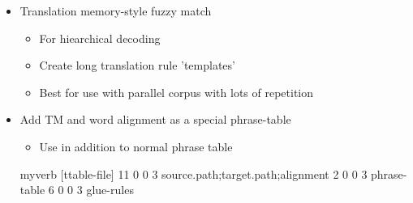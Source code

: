 \documentclass[landscape]{uedslides2C}
\newcommand{\currenttopic}[1]{\colorbox{lightyellow}{\textcolor{black}{\bf #1}}}
\begin{document}
\begin{itemize} \itemsep -1mm
\item Translation memory-style fuzzy match
  \begin{itemize}
  \item For hiearchical decoding
  \item Create long translation rule 'templates'
  \item Best for use with parallel corpus with lots of repetition
  \end{itemize}

\item Add TM and word alignment as a special phrase-table
  \begin{itemize}
    \item Use in addition to normal phrase table
  \end{itemize}
  \begin{SaveVerbatim}{myverb} 
   [ttable-file]
   11 0 0 3 source.path;target.path;alignment 
   2 0 0 3 phrase-table
   6 0 0 3 glue-rules
  \end{SaveVerbatim}
  \colorbox{gray}{}

\end{itemize}



\end{document}
